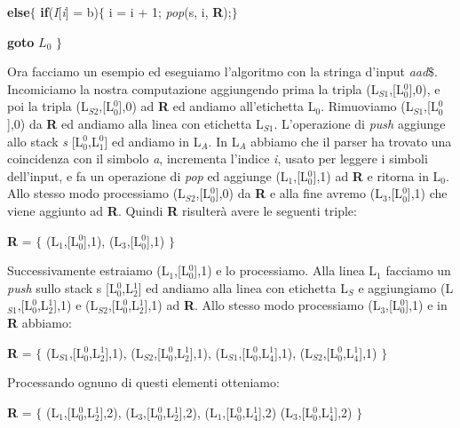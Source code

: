 \hspace{0.2cm} \textbf{else}$\{$ \textbf{if}(\textit{I}[\textit{i}] = b)$\{$ i = i + 1; \textit{pop}(s, i, \textbf{R});$\}$ \par
\hspace{1.5cm}\textbf{goto} $L_0$ $\}$ \par 
\vspace{0.3cm}
Ora facciamo un esempio ed eseguiamo l'algoritmo con la stringa d'input \textit{aad}$\$$. Incomiciamo la nostra computazione aggiungendo prima la tripla (L$_{S1}$,[L$_0^{0}$],0), e poi la tripla (L$_{S2}$,[L$_0^{0}$],0) ad \textbf{R} ed andiamo all'etichetta L$_0$. Rimuoviamo (L$_{S1}$,[L$_0^{0}$],0) da \textbf{R} ed andiamo alla linea con etichetta L$_{S1}$. L'operazione di \textit{push} aggiunge allo stack \textit{s} [L$_0^{0}$,L$_1^{0}$] ed andiamo in L$_A$. In L$_A$ abbiamo che il parser ha trovato una coincidenza con il simbolo \textit{a}, incrementa l'indice \textit{i}, usato per leggere i simboli dell'input, e fa un operazione di \textit{pop} ed aggiunge  (L$_{1}$,[L$_0^{0}$],1) ad \textbf{R} e ritorna in L$_0$. Allo stesso modo processiamo  (L$_{S2}$,[L$_0^{0}$],0) da \textbf{R} e alla fine avremo (L$_{3}$,[L$_0^{0}$],1) che viene aggiunto ad \textbf{R}. Quindi \textbf{R} risulterà avere le seguenti triple:\par
\hspace{1.5cm} \textbf{R} = $\{$ (L$_{1}$,[L$_0^{0}$],1), (L$_{3}$,[L$_0^{0}$],1) $\}$\par
\vspace{0.3cm}Successivamente estraiamo (L$_{1}$,[L$_0^{0}$],1) e lo processiamo. Alla linea L$_1$ facciamo un \textit{push} sullo stack s [L$_0^{0}$,L$_2^{1}$] ed andiamo alla linea con etichetta L$_S$ e aggiungiamo (L$_{S1}$,[L$_0^{0}$,L$_2^{1}$],1) e (L$_{S2}$,[L$_0^{0}$,L$_2^{1}$],1) ad \textbf{R}. Allo stesso modo processiamo (L$_{3}$,[L$_0^{0}$],1) e in \textbf{R} abbiamo:\par
\vspace{0.3cm}\textbf{R} = $\{$ (L$_{S1}$,[L$_0^{0}$,L$_2^{1}$],1), (L$_{S2}$,[L$_0^{0}$,L$_2^{1}$],1), (L$_{S1}$,[L$_0^{0}$,L$_4^{1}$],1), (L$_{S2}$,[L$_0^{0}$,L$_4^{1}$],1) $\}$\par
\vspace{0.3cm} Processando ognuno di questi elementi otteniamo:\par 
\vspace{0.3cm} \textbf{R} = $\{$  (L$_{1}$,[L$_0^{0}$,L$_2^{1}$],2), (L$_{3}$,[L$_0^{0}$,L$_2^{1}$],2),  (L$_{1}$,[L$_0^{0}$,L$_4^{1}$],2) (L$_{3}$,[L$_0^{0}$,L$_4^{1}$],2) $\}$\par 
